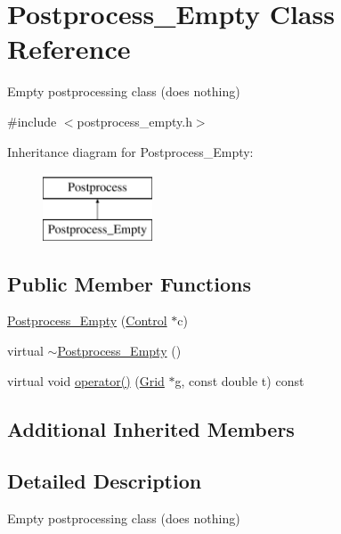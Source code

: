 \hypertarget{class_postprocess___empty}{}\section{Postprocess\+\_\+\+Empty Class Reference}
\label{class_postprocess___empty}


Empty postprocessing class (does nothing)  




{\ttfamily \#include $<$postprocess\+\_\+empty.\+h$>$}

Inheritance diagram for Postprocess\+\_\+\+Empty\+:\begin{figure}[H]
\begin{center}
\leavevmode
\includegraphics[height=2.000000cm]{class_postprocess___empty}
\end{center}
\end{figure}
\subsection*{Public Member Functions}
\begin{DoxyCompactItemize}
\item 
\hyperlink{class_postprocess___empty_aa05a5aab05e64ff937ce844e3b08e17a}{Postprocess\+\_\+\+Empty} (\hyperlink{class_control}{Control} $\ast$c)
\item 
virtual \hyperlink{class_postprocess___empty_a44b647468fdde2620bc9e047f50076ab}{$\sim$\+Postprocess\+\_\+\+Empty} ()
\item 
virtual void \hyperlink{class_postprocess___empty_a4ff530ac6ee362ba6d15b4cdffc1d596}{operator()} (\hyperlink{class_grid}{Grid} $\ast$g, const double t) const 
\end{DoxyCompactItemize}
\subsection*{Additional Inherited Members}


\subsection{Detailed Description}
Empty postprocessing class (does nothing) 


